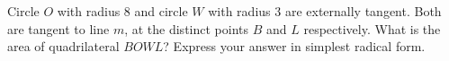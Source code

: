 Circle $O$ with radius $8$ and circle $W$ with radius $3$ are externally tangent. Both are tangent to line $m$, at the distinct points $B$ and $L$ respectively. What is the area of quadrilateral $BOWL$? Express your answer in simplest radical form.
